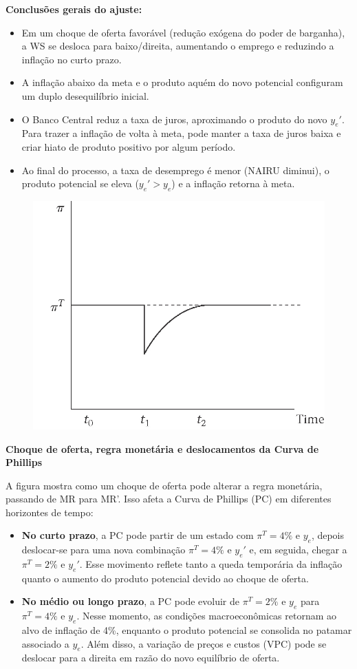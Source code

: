 \documentclass[a4paper,12pt]{article}[abntex2]
\begin{document}
\textbf{Conclusões gerais do ajuste:}
\begin{itemize}
    \item Em um choque de oferta favorável (redução exógena do poder de barganha), a WS se desloca para baixo/direita, aumentando o emprego e reduzindo a inflação no curto prazo.
    \item A inflação abaixo da meta e o produto aquém do novo potencial configuram um duplo desequilíbrio inicial.
    \item O Banco Central reduz a taxa de juros, aproximando o produto do novo $y_e'$. Para trazer a inflação de volta à meta, pode manter a taxa de juros baixa e criar hiato de produto positivo por algum período.
    \item Ao final do processo, a taxa de desemprego é menor (NAIRU diminui), o produto potencial se eleva ($y_e' > y_e$) e a inflação retorna à meta.
\end{itemize}

\begin{figure}[H]
    \centering
    \includegraphics[width=0.7\linewidth]{Imagens/a14i2.png}
\end{figure}


\textbf{Choque de oferta, regra monetária e deslocamentos da Curva de Phillips}

A figura mostra como um choque de oferta pode alterar a regra monetária, passando de MR para MR'. Isso afeta a Curva de Phillips (PC) em diferentes horizontes de tempo:

\begin{itemize}
    \item \textbf{No curto prazo}, a PC pode partir de um estado com \(\pi^T = 4\%\) e \(y_e\), depois deslocar-se para uma nova combinação \(\pi^T = 4\%\) e \(y_e'\) e, em seguida, chegar a \(\pi^T = 2\%\) e \(y_e'\). Esse movimento reflete tanto a queda temporária da inflação quanto o aumento do produto potencial devido ao choque de oferta.
    \item \textbf{No médio ou longo prazo}, a PC pode evoluir de \(\pi^T = 2\%\) e \(y_e\) para \(\pi^T = 4\%\) e \(y_e\). Nesse momento, as condições macroeconômicas retornam ao alvo de inflação de 4\%, enquanto o produto potencial se consolida no patamar associado a \(y_e\). Além disso, a variação de preços e custos (VPC) pode se deslocar para a direita em razão do novo equilíbrio de oferta.
\end{itemize}
\end{document}
